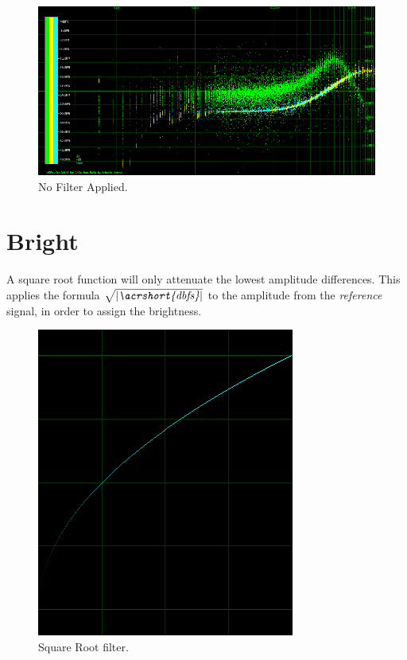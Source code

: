 \documentclass[10pt,a4paper]{report}
\newcommand{\ac}[1]{\textit{\mbox{\acrshort{#1}}}}
\newcommand{\rootdb}{$\sqrt{|\ac{dbfs}|}$}
\begin{document}
\begin{appendices}
\begin{figure}[H]
	\centering
	\includegraphics[width=1\linewidth]{images/colorfilter/BetaFunctionPlot_0_Data.png}
	\caption[No Filter]{No Filter Applied.}
	\label{fig:betafunctionplot0data}
\end{figure}

\section{Bright} 

A square root function will only attenuate the lowest amplitude differences. This applies the formula \rootdb{} to the amplitude from the \textit{reference} signal, in order to assign the brightness.

\begin{figure}[H]
	\centering
	\includegraphics[width=0.4\linewidth]{images/colorfilter/BetaFunctionPlot_1.png}
	\caption[Square Root filter]{Square Root filter.}
	\label{fig:betafunctionplot1}
\end{figure}


\end{appendices}
\end{document}
